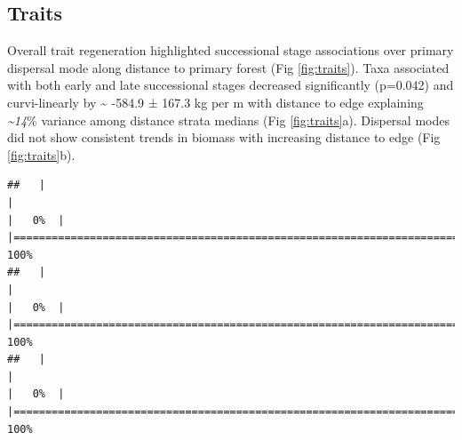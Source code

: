 \documentclass[
  12pt,
]{article}
\begin{document}
\hypertarget{traits}{%
\subsection{Traits}\label{traits}}

Overall trait regeneration highlighted successional stage associations over primary dispersal mode along distance to primary forest
(Fig \ref{fig:traits}).
Taxa associated with both early and late successional stages decreased significantly
(p=0.042)
and curvi-linearly
by
\textasciitilde{} -584.9 ±
167.3 kg per m
with distance to edge explaining
\emph{\textasciitilde14}\% variance
among distance strata medians
(Fig \ref{fig:traits}a).
Dispersal modes did not show consistent trends in biomass with increasing distance to edge
(Fig \ref{fig:traits}b).

\begin{verbatim}
##   |                                                                              |                                                                      |   0%  |                                                                              |======================================================================| 100%
##   |                                                                              |                                                                      |   0%  |                                                                              |======================================================================| 100%
##   |                                                                              |                                                                      |   0%  |                                                                              |======================================================================| 100%
\end{verbatim}
\end{document}
